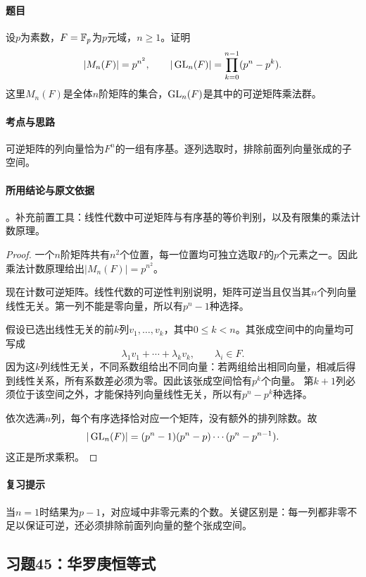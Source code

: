 \paragraph{题目}
设$p$为素数，$F=\mathbb F_p$为$p$元域，$n\geq1$。证明
\[
|M_n(F)|=p^{n^2},\qquad
|\operatorname{GL}_n(F)|=\prod_{k=0}^{n-1}(p^n-p^k).
\]
这里$M_n(F)$是全体$n$阶矩阵的集合，$\operatorname{GL}_n(F)$是其中的可逆矩阵乘法群。

\paragraph{考点与思路}
可逆矩阵的列向量恰为$F^n$的一组有序基。逐列选取时，排除前面列向量张成的子空间。

\paragraph{所用结论与原文依据}
。补充前置工具：线性代数中可逆矩阵与有序基的等价判别，以及有限集的乘法计数原理。


\begin{proof}
一个$n$阶矩阵共有$n^2$个位置，每一位置均可独立选取$F$的$p$个元素之一。因此乘法计数原理给出$|M_n(F)|=p^{n^2}$。

现在计数可逆矩阵。线性代数的可逆性判别说明，矩阵可逆当且仅当其$n$个列向量线性无关。第一列不能是零向量，所以有$p^n-1$种选择。

假设已选出线性无关的前$k$列$v_1,\ldots,v_k$，其中$0\leq k<n$。其张成空间中的向量均可写成
\[
\lambda_1v_1+\cdots+\lambda_kv_k,\qquad \lambda_i\in F.
\]
因为这$k$列线性无关，不同系数组给出不同向量：若两组给出相同向量，相减后得到线性关系，所有系数差必须为零。因此该张成空间恰有$p^k$个向量。
第$k+1$列必须位于该空间之外，才能保持列向量线性无关，所以有$p^n-p^k$种选择。

依次选满$n$列，每个有序选择恰对应一个矩阵，没有额外的排列除数。故
\[
|\operatorname{GL}_n(F)|=(p^n-1)(p^n-p)\cdots(p^n-p^{n-1}).
\]
这正是所求乘积。
\end{proof}

\paragraph{复习提示}
当$n=1$时结果为$p-1$，对应域中非零元素的个数。关键区别是：每一列都非零不足以保证可逆，还必须排除前面列向量的整个张成空间。


\subsection{习题45：\texorpdfstring{华罗庚恒等式}{华罗庚恒等式}}
\label{ex:1:45}

